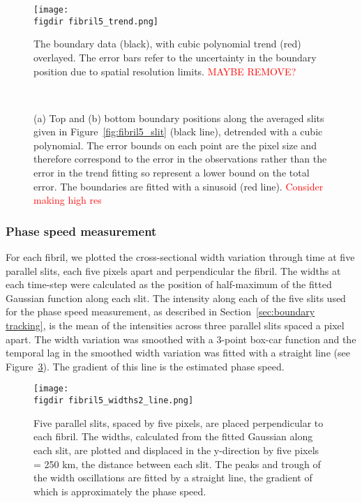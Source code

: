 \documentclass[12pt]{../style-files/ociamthesis}
\newcommand{\figdir}{../main/figures/chpt-4/} %
\begin{document}
\begin{figure}
\centering
\texttt{[image: \\figdir fibril5\_trend.png]}
\caption{The boundary data (black), with cubic polynomial trend (red) overlayed. The error bars refer to the uncertainty in the boundary position due to spatial resolution limits. \textcolor{red}{MAYBE REMOVE?}}
\label{fig:fibril5_trend}
\end{figure}

\begin{figure}
	\centering
	 \\
	\caption{(a) Top and (b) bottom boundary positions along the averaged slits given in Figure~\ref{fig:fibril5_slit} (black line), detrended with a cubic polynomial. The error bounds on each point are the pixel size and therefore correspond to the error in the observations rather than the error in the trend fitting so represent a lower bound on the total error. The boundaries are fitted with a sinusoid (red line). \textcolor{red}{Consider making high res}}
	\label{fig:fibril5_detrend}
\end{figure}


\subsubsection{Phase speed measurement} \label{sec:phase speed}

For each fibril, we plotted the cross-sectional width variation through time at five parallel slits, each five pixels apart and perpendicular the fibril. The widths at each time-step were calculated as the position of half-maximum of the fitted Gaussian function along each slit. The intensity along each of the five slits used for the phase speed measurement, as described in Section~\ref{sec:boundary tracking}, is the mean of the intensities across three parallel slits spaced a pixel apart. The width variation was smoothed with a 3-point box-car function and the temporal lag in the smoothed width variation was fitted with a straight line (see Figure~\ref{fig:fibril5_width}). The gradient of this line is the estimated phase speed.

\begin{figure}
	\centering
	\texttt{[image: \\figdir fibril5\_widths2\_line.png]}
	\caption{Five parallel slits, spaced by five pixels, are placed perpendicular to each fibril. The widths, calculated from the fitted Gaussian along each slit, are plotted and displaced in the y-direction by five pixels = 250 km, the distance between each slit. The peaks and trough of the width oscillations are fitted by a straight line, the gradient of which is approximately the phase speed.}
	\label{fig:fibril5_width}
\end{figure}
\end{document}
